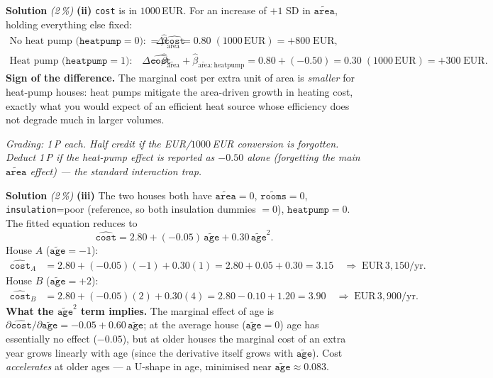 \documentclass[11pt,a4paper]{article}
\newcommand{\subpoints}[1]{\textit{(#1\,\%)}}
\newcommand{\sol}{\noindent\textbf{Solution}}
\begin{document}
\medskip
\sol{} \subpoints{2} \textbf{(ii)} \texttt{cost} is in $1000$\,EUR. For an increase of $+1$ SD in
$\widetilde{\texttt{area}}$, holding everything else fixed:
\begin{align*}
\text{No heat pump (}\texttt{heatpump}=0\text{):}\quad
   \Delta\widehat{\texttt{cost}} &= \hat\beta_{\widetilde{\text{area}}} = 0.80 \;(1000\,\text{EUR})
   = \boxed{+800\;\text{EUR}}, \\
\text{Heat pump (}\texttt{heatpump}=1\text{):}\quad
   \Delta\widehat{\texttt{cost}} &= \hat\beta_{\widetilde{\text{area}}}+\hat\beta_{\widetilde{\text{area}}:\text{heatpump}}
   = 0.80 + (-0.50) = 0.30 \;(1000\,\text{EUR})
   = \boxed{+300\;\text{EUR}}.
\end{align*}
\textbf{Sign of the difference.} The marginal cost per extra unit of area is \emph{smaller} for
heat-pump houses: heat pumps mitigate the area-driven growth in heating cost, exactly what you
would expect of an efficient heat source whose efficiency does not degrade much in larger
volumes.

\noindent\emph{Grading: 1\,P each. Half credit if the EUR/$1000$\,EUR conversion is forgotten.
Deduct 1\,P if the heat-pump effect is reported as $-0.50$ alone (forgetting the main
$\widetilde{\texttt{area}}$ effect) --- the standard interaction trap.}

\medskip
\sol{} \subpoints{2} \textbf{(iii)} The two houses both have $\widetilde{\texttt{area}}=0$,
$\widetilde{\texttt{rooms}}=0$, \texttt{insulation}=poor (reference, so both insulation dummies
$=0$), $\texttt{heatpump}=0$. The fitted equation reduces to
$$\widehat{\texttt{cost}} = 2.80 + (-0.05)\,\widetilde{\texttt{age}} + 0.30\,\widetilde{\texttt{age}}^2.$$
House $A$ ($\widetilde{\texttt{age}} = -1$):
\begin{align*}
\widehat{\texttt{cost}}_A &= 2.80 + (-0.05)(-1) + 0.30(1) = 2.80 + 0.05 + 0.30 = 3.15
\quad\Rightarrow\;\boxed{\mathrm{EUR}\,3{,}150\text{/yr}}.
\end{align*}
House $B$ ($\widetilde{\texttt{age}} = +2$):
\begin{align*}
\widehat{\texttt{cost}}_B &= 2.80 + (-0.05)(2) + 0.30(4) = 2.80 - 0.10 + 1.20 = 3.90
\quad\Rightarrow\;\boxed{\mathrm{EUR}\,3{,}900\text{/yr}}.
\end{align*}
\textbf{What the $\widetilde{\texttt{age}}^2$ term implies.} The marginal effect of age is
$\partial\widehat{\texttt{cost}}/\partial\widetilde{\texttt{age}} = -0.05 + 0.60\,\widetilde{\texttt{age}}$;
at the average house ($\widetilde{\texttt{age}}=0$) age has essentially no effect ($-0.05$), but at
older houses the marginal cost of an extra year grows linearly with age (since the derivative
itself grows with $\widetilde{\texttt{age}}$). Cost \emph{accelerates} at older ages --- a U-shape
in age, minimised near $\widetilde{\texttt{age}} \approx 0.083$.
\end{document}
